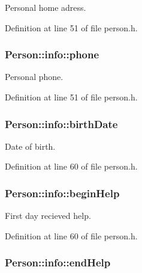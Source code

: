 Personal home adress. 



Definition at line 51 of file person.\+h.

\hypertarget{struct_person_1_1info_a07a8d88e73398595a0e0282eaffe9fef}{
\subsubsection[{phone}]{\setlength{\rightskip}{0pt plus 5cm}Person\+::info\+::phone}}\label{struct_person_1_1info_a07a8d88e73398595a0e0282eaffe9fef}


Personal phone. 



Definition at line 51 of file person.\+h.

\hypertarget{struct_person_1_1info_a803a2ee586aaa2503e10447b1435e916}{
\subsubsection[{birth\+Date}]{\setlength{\rightskip}{0pt plus 5cm}Person\+::info\+::birth\+Date}}\label{struct_person_1_1info_a803a2ee586aaa2503e10447b1435e916}


Date of birth. 



Definition at line 60 of file person.\+h.

\hypertarget{struct_person_1_1info_a835c907e641433331e06c62bcde9dfe9}{
\subsubsection[{begin\+Help}]{\setlength{\rightskip}{0pt plus 5cm}Person\+::info\+::begin\+Help}}\label{struct_person_1_1info_a835c907e641433331e06c62bcde9dfe9}


First day recieved help. 



Definition at line 60 of file person.\+h.

\hypertarget{struct_person_1_1info_acc738154c5e01adc22c880fc49d6e09c}{
\subsubsection[{end\+Help}]{\setlength{\rightskip}{0pt plus 5cm}Person\+::info\+::end\+Help}}\label{struct_person_1_1info_acc738154c5e01adc22c880fc49d6e09c}


